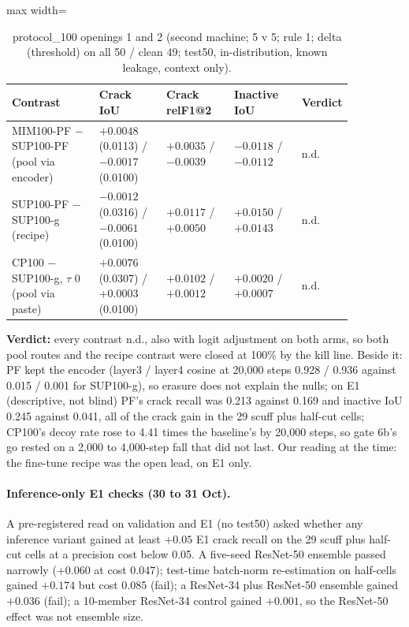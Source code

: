 \begin{table}[htbp]
\centering
\footnotesize
\caption[protocol\_100 openings 1 and 2 (31 Oct)]{protocol\_100 openings 1 and 2 (second machine; 5 v 5; rule 1; delta (threshold)
on all 50 / clean 49; test50, in-distribution, known leakage, context only).}
\label{tab:midnov-p100}
\begin{adjustbox}{max width=\linewidth}
\begin{tabular}{@{}p{0.26\linewidth}p{0.20\linewidth}p{0.20\linewidth}p{0.20\linewidth}l@{}}
\toprule
Contrast & Crack IoU & Crack relF1@2 & Inactive IoU & Verdict \\
\midrule
MIM100-PF $-$ SUP100-PF (pool via encoder) & $+0.0048$ (0.0113) / $-0.0017$ (0.0100) & $+0.0035$ / $-0.0039$ & $-0.0118$ / $-0.0112$ & n.d. \\
SUP100-PF $-$ SUP100-g (recipe) & $-0.0012$ (0.0316) / $-0.0061$ (0.0100) & $+0.0117$ / $+0.0050$ & $+0.0150$ / $+0.0143$ & n.d. \\
CP100 $-$ SUP100-g, $\tau$ 0 (pool via paste) & $+0.0076$ (0.0307) / $+0.0003$ (0.0100) & $+0.0102$ / $+0.0012$ & $+0.0020$ / $+0.0007$ & n.d. \\
\bottomrule
\end{tabular}
\end{adjustbox}
\end{table}

\textbf{Verdict:} every contrast n.d., also with logit adjustment on both arms, so both pool routes and the recipe contrast were
closed at 100\% by the kill line. Beside it: PF kept the encoder (layer3 / layer4 cosine at 20,000 steps 0.928 / 0.936 against 0.015 /
0.001 for SUP100-g), so erasure does not explain the nulls; on E1 (descriptive, not blind) PF's crack recall was 0.213 against 0.169
and inactive IoU 0.245 against 0.041, all of the crack gain in the 29 scuff plus half-cut cells; CP100's decoy rate rose to 4.41
times the baseline's by 20,000 steps, so gate 6b's go rested on a 2,000 to 4,000-step fall that did not last. Our reading at the
time: the fine-tune recipe was the open lead, on E1 only.

\paragraph{Inference-only E1 checks (30 to 31 Oct).} A pre-registered read on validation and E1 (no test50) asked whether any
inference variant gained at least $+0.05$ E1 crack recall on the 29 scuff plus half-cut cells at a precision cost below 0.05. A five-seed
ResNet-50 ensemble passed narrowly ($+0.060$ at cost 0.047); test-time batch-norm re-estimation on half-cells gained $+0.174$ but cost
0.085 (fail); a ResNet-34 plus ResNet-50 ensemble gained $+0.036$ (fail); a 10-member ResNet-34 control gained $+0.001$, so the
ResNet-50 effect was not ensemble size.

